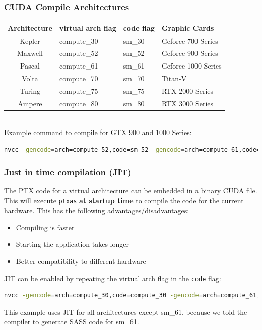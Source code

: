 \documentclass[aspectratio=169,handout]{beamer}
\begin{document}
\begin{frame}[fragile]
\frametitle{CUDA Compile Architectures}
	
		\begin{tabular}{c|l|l|l}
		Architecture & virtual arch flag & code flag & Graphic Cards\\	
		\hline
		Kepler & compute\_30 & sm\_30 & Geforce 700 Series\\
		Maxwell & compute\_52 & sm\_52 & Geforce 900 Series\\
		Pascal & compute\_61 & sm\_61 & Geforce 1000 Series\\
		Volta & compute\_70 & sm\_70 & Titan-V\\
		Turing & compute\_75 & sm\_75 & RTX 2000 Series\\	
	    Ampere & compute\_80 & sm\_80 & RTX 3000 Series\\	
	\end{tabular}
\\
	\vspace{0.6cm}
	Example command to compile for GTX 900 and 1000 Series:
\begin{lstlisting}[language=bash]
nvcc -gencode=arch=compute_52,code=sm_52 -gencode=arch=compute_61,code=sm_61 main.cu -o main
\end{lstlisting}
\end{frame}


\begin{frame}[fragile]
\frametitle{Just in time compilation (JIT)}
The PTX code for a virtual architecture can be embedded in a binary CUDA file. This will execute \texttt{ptxas} \textbf{at startup time} to compile the code for the current hardware. This has the following advantages/disadvantages:
\begin{itemize}
	\item Compiling is faster
	\item Starting the application takes longer
	\item Better compatibility to  different hardware
\end{itemize}
JIT can be enabled by repeating the virtual arch flag in the \texttt{code} flag:
\begin{lstlisting}[language=bash]
nvcc -gencode=arch=compute_30,code=compute_30 -gencode=arch=compute_61,code=sm_61 main.cu -o main
\end{lstlisting}
This example uses JIT for all architectures except sm\_61, because we told the compiler to generate SASS code for sm\_61.
\end{frame}
\end{document}
